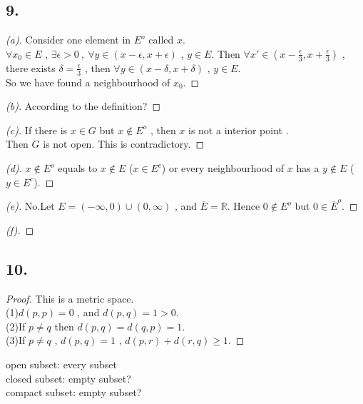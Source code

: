 \documentclass{report}
\begin{document}
            \subsection*{9.}
                \begin{proof}[(a)]
                    Consider one element in $E^o$ called $x$.\\
                    $\forall x_0 \in E $ ,
                     $\exists \epsilon > 0 \ , \ \forall y \in (x-\epsilon,x+\epsilon)$ , $y \in E$.
                     Then $\forall x' \in (x- \frac{\epsilon}{3},x+ \frac{\epsilon}{3})$ ,
                     there exists $ \delta = \frac{\epsilon}{3}$ , then $\forall y \in (x-\delta,x+\delta)$ , $y \in E$.\\
                     So we have found a neighbourhood of $x_0$.
                \end{proof}
                \begin{proof}[(b)]
                    According to the definition?
                \end{proof}
                \begin{proof}[(c)]
                    If there is $x \in G$ but $x \notin E^o$ , then $x$ is not a interior point .\\
                    Then $G$ is not open. This is contradictory.
                \end{proof}
                \begin{proof}[(d)]
                    $x \notin E^o$ equals to $x \notin E$ ($x \in E^c$) or every neighbourhood of $x$ has a $y \notin E$ ($y \in E^c$).
                \end{proof}
                \begin{proof}[(e)]
                    No.Let $E=(-\infty,0)\cup(0,\infty)$ , and $\overline{E}=\mathbb{R}$.
                    Hence $0 \notin E^o$ but $0 \in \overline{E}^o$.
                \end{proof}
                \begin{proof}[(f)]
                    
                \end{proof}
            \subsection*{10.}
                \begin{proof}
                    This is a metric space.\\
                    (1)$d(p,p)=0$ , and $d(p,q)=1>0$.\\
                    (2)If $p \not = q$ then $d(p,q)=d(q,p)=1$.\\
                    (3)If $p \not = q$ , $d(p,q)=1$ , $d(p,r)+d(r,q) \ge1$.
                \end{proof}
                open subset: every subset\\
                closed subset: empty subset?\\
                compact subset: empty subset?\\
\end{document}
